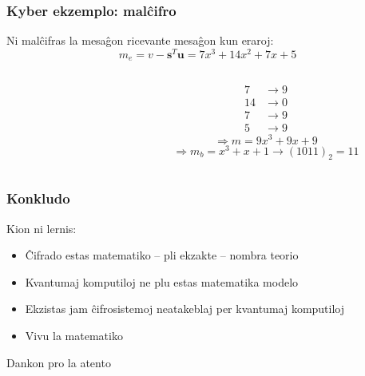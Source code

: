 \documentclass[utf8]{scrartcl}
\begin{document}
\begin{frame}
  \frametitle{Kyber ekzemplo: malĉifro}
  Ni malĉifras la mesaĝon ricevante mesaĝon kun eraroj:
  \[m_e = v - \mathbf{s}^T\mathbf{u} = 7x^3 + 14x^2 + 7x + 5\]

  \pause
  \begin{columns}
    \begin{column}{0.4\textwidth}
    \end{column}

    \begin{column}{0.6\textwidth}
      \[
        \begin{split}
          7 & \longrightarrow 9 \\
          14 & \longrightarrow 0 \\
          7 & \longrightarrow 9 \\
          5 & \longrightarrow 9
        \end{split}
      \]
      \pause
      \[\Longrightarrow m = 9x^3 + 9x + 9\]
      \pause
      \[\Longrightarrow m_b = x^3 + x + 1 \longrightarrow (1011)_2 = 11\]
    \end{column}
  \end{columns}
\end{frame}

\begin{frame}
  \frametitle{Konkludo}
  Kion ni lernis:
  \begin{itemize}
  \item Ĉifrado estas matematiko – pli ekzakte – nombra teorio
  \item Kvantumaj komputiloj ne plu estas matematika modelo
  \item Ekzistas jam ĉifrosistemoj neatakeblaj per kvantumaj komputiloj
  \item<2-> Vivu la matematiko
  \end{itemize}
\end{frame}

\begin{frame}
  \centering Dankon pro la atento
\end{frame}
\end{document}
